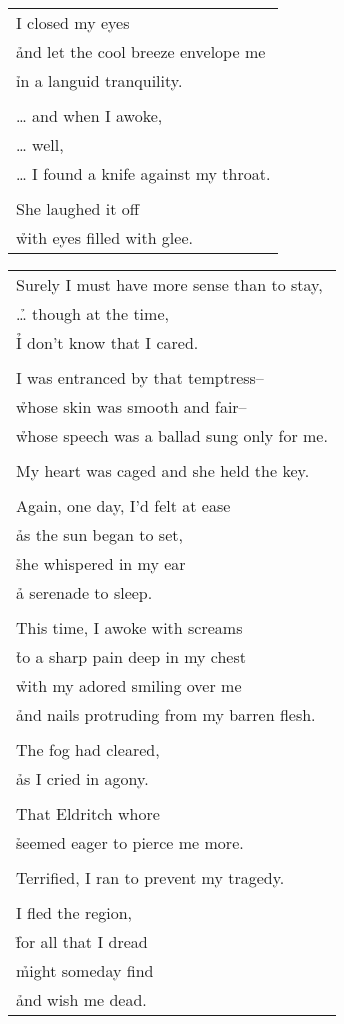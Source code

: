 \documentclass{article}
\begin{document}
\begin{center}
\begin{tabular}{l}
\\
I closed my eyes \\
\h and let the cool breeze envelope me \\
\h in a languid tranquility. \\
\\
\ldots{} and when I awoke, \\
\ldots{} well, \\
\ldots{} I found a knife against my throat. \\
\\
She laughed it off \\
\h with eyes filled with glee. \\
\end{tabular}
\newpage
\begin{tabular}{l}
Surely I must have more sense than to stay, \\
\h\ldots{} though at the time, \\
\h I don't know that I cared. \\
\\
I was entranced by that temptress-- \\
\h whose skin was smooth and fair-- \\
\h whose speech was a ballad sung only for me. \\
\\
My heart was caged and she held the key. \\
\\
Again, one day, I'd felt at ease \\
\h as the sun began to set, \\
\h she whispered in my ear \\
\h a serenade to sleep. \\
\\
This time, I awoke with screams \\
\h to a sharp pain deep in my chest \\
\h with my adored smiling over me \\
\h and nails protruding from my barren flesh. \\
\\
The fog had cleared, \\
\h as I cried in agony. \\
\\
That Eldritch whore \\
\h seemed eager to pierce me more. \\
\\
Terrified, I ran to prevent my tragedy. \\
\\
I fled the region, \\
\h for all that I dread \\
\h might someday find \\
\h and wish me dead. \\
\end{tabular}
\end{center}
\end{document}
